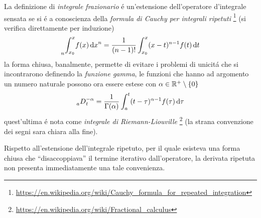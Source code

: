 \begin{multicols*}{3}
  La definizione di \textit{integrale frazionario} \'e un'estensione dell'operatore d'integrale sensata se
  si \'e a conoscienza della \textit{formula di Cauchy per integrali ripetuti}
  \footnote{\url{https://en.wikipedia.org/wiki/Cauchy_formula_for_repeated_integration}}
  (si verifica direttamente per induzione)
  \begin{equation}
    \label{eq:cauchy-formula}
    \prescript{}{n}{\int_{x_0}^x} f(x) \dd{x}^n = \frac{1}{(n-1)!} \int_{x_0}^x (x-t)^{n-1}f(t)\dd{t}
  \end{equation}
  la forma chiusa, banalmente, permette di evitare i problemi di unicit\'a che si incontrarono definendo
  la \textit{funzione gamma}, le funzioni che hanno ad argomento un numero naturale possono ora essere
  estese con $\alpha \in \mathbb{R}^+\setminus \{0\}$
  \begin{equation}
    \label{eq:cauchy-formula}
    \prescript{}{a}{D}_t^{-\alpha} = \frac{1}{\Gamma(\alpha)} \int_{a}^t (t-\tau)^{\alpha-1}f(\tau)\dd{\tau}
  \end{equation}
  quest'ultima \'e nota come \textit{integrale di Riemann-Liouville}
  \footnote{\url{https://en.wikipedia.org/wiki/Fractional_calculus}}
  (la strana convenzione dei segni sara chiara alla fine).

  Rispetto all'estensione dell'integrale ripetuto, per il quale esisteva una forma chiusa che
  ``disaccoppiava'' il termine iterativo dall'operatore, la derivata ripetuta non presenta
  immediatamente una tale convenienza. \\


\end{multicols*}

